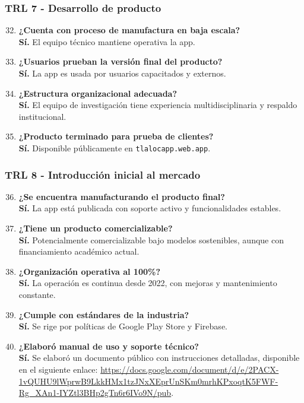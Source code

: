 \subsubsection*{TRL 7 - Desarrollo de producto}
\begin{enumerate}
    \setcounter{enumi}{31}
    \item \textbf{¿Cuenta con proceso de manufactura en baja escala?} \\ \textbf{Sí.} El equipo técnico mantiene operativa la app.
    
    \item \textbf{¿Usuarios prueban la versión final del producto?} \\ \textbf{Sí.} La app es usada por usuarios capacitados y externos.
    
    \item \textbf{¿Estructura organizacional adecuada?} \\ \textbf{Sí.} El equipo de investigación tiene experiencia multidisciplinaria y respaldo institucional.
    
    \item \textbf{¿Producto terminado para prueba de clientes?} \\ \textbf{Sí.} Disponible públicamente en \texttt{tlalocapp.web.app}.
\end{enumerate}

\subsubsection*{TRL 8 - Introducción inicial al mercado}
\begin{enumerate}
    \setcounter{enumi}{35}
    \item \textbf{¿Se encuentra manufacturando el producto final?} \\ \textbf{Sí.} La app está publicada con soporte activo y funcionalidades estables.
    
    \item \textbf{¿Tiene un producto comercializable?} \\ \textbf{Sí.} Potencialmente comercializable bajo modelos sostenibles, aunque con financiamiento académico actual.
    
    \item \textbf{¿Organización operativa al 100\%?} \\ \textbf{Sí.} La operación es continua desde 2022, con mejoras y mantenimiento constante.
    
    \item \textbf{¿Cumple con estándares de la industria?} \\ \textbf{Sí.} Se rige por políticas de Google Play Store y Firebase.
    
    \item \textbf{¿Elaboró manual de uso y soporte técnico?} \\ \textbf{Sí.} Se elaboró un documento público con instrucciones detalladas, disponible en el siguiente enlace: \url{https://docs.google.com/document/d/e/2PACX-1vQUHU9lWprwB9LkkHMx1tzJNxXEprUnSKm0mrhKPxoqtK5FWF-Rg_XAn1-IYZtl3BHp2gTn6r6IVo9N/pub}.

\end{enumerate}

